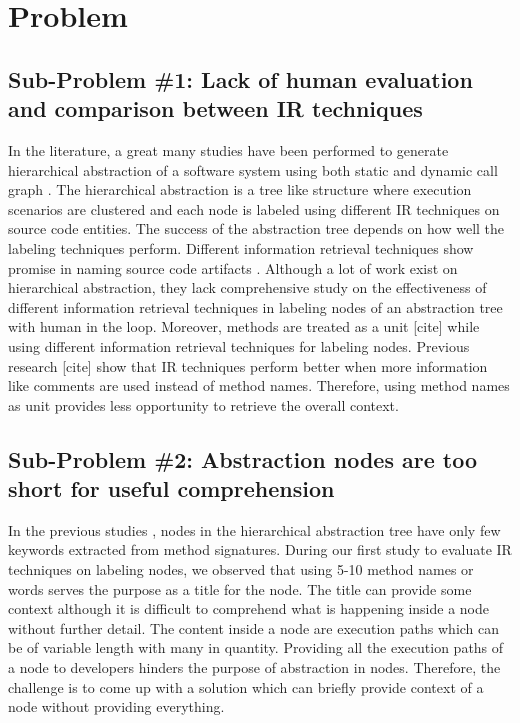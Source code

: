  
\newpage


\section{Problem }
\label{intro:problem}
    \subsection{Sub-Problem \#1: Lack of human evaluation and comparison between IR techniques} In the literature, a great many studies have been performed to generate hierarchical abstraction of a software system using both static and dynamic call graph \cite{feng2018hierarchicalExecutionComprehension, gharibi2018automaticStaticCluster, xin2019identifyingFeaturesExecution}. The hierarchical abstraction is a tree like structure where execution scenarios are clustered and each node is labeled using different IR techniques on source code entities. The success of the abstraction tree depends on how well the labeling techniques perform. Different information retrieval techniques show promise in naming source code artifacts \cite{chen2016topicMiningRepositories, panichella2013topicModelsTasks, sun2016surveyTopicSE}. Although a lot of work exist on hierarchical abstraction, they lack comprehensive study on the effectiveness of different information retrieval techniques in labeling nodes of an abstraction tree with human in the loop. Moreover, methods are treated as a unit [cite] while using different information retrieval techniques for labeling nodes. Previous research [cite] show that IR techniques perform better when more information like comments are used instead of method names. Therefore, using method names as unit provides less opportunity to retrieve the overall context.
    

    \subsection{Sub-Problem \#2: Abstraction nodes are too short for useful comprehension}
    In the previous studies \cite{feng2018hierarchicalExecutionComprehension, gharibi2018automaticStaticCluster}, nodes in the hierarchical abstraction tree have only few keywords extracted from method signatures. During our first study to evaluate IR techniques on labeling nodes, we observed that using 5-10 method names or words serves the purpose as a title for the node. The title can provide some context although it is difficult to comprehend what is happening inside a node without further detail. The content inside a node are execution paths which can be of variable length with many in quantity. Providing all the execution paths of a node to developers hinders the purpose of abstraction in nodes. Therefore, the challenge is to come up with a solution which can briefly provide context of a node without providing everything. 
    
